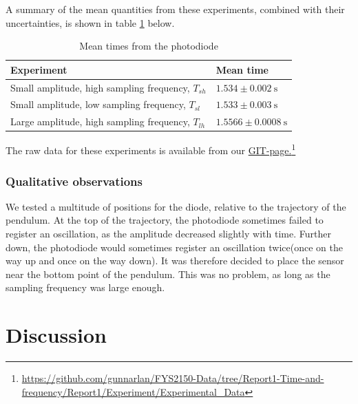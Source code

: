 \documentclass[a4paper, 10pt]{article}
\begin{document}
\linebreak
A summary of the mean quantities from these experiments, combined with their uncertainties, is shown in table \ref{tab:mean_times_photodiode} below.
\begin{table}[hb!]
\centering
\caption{Mean times from the photodiode}
\label{tab:mean_times_photodiode}
\begin{tabular}{|l|l|}
\hline
\textbf{Experiment}                              & \textbf{Mean time}                 \\
\hline
Small amplitude, high sampling frequency, $T_{sh}$     & $1.534 \pm 0.002 \ \mathrm{s}$ \\
Small amplitude, low sampling frequency, $T_{sl}$ & $1.533 \pm 0.003\ \mathrm{s}$   \\
Large amplitude, high sampling frequency, $T_{lh}$ & $1.5566 \pm 0.0008\ \mathrm{s}$   \\
\hline 
\end{tabular}
\end{table}
The raw data for these experiments is available from our \href{https://github.com/gunnarlan/FYS2150-Data/tree/Report1-Time-and-frequency/Report1/Experiment/Experimental_Data}{GIT-page.}\footnote{\url{https://github.com/gunnarlan/FYS2150-Data/tree/Report1-Time-and-frequency/Report1/Experiment/Experimental_Data}}
\subsubsection{Qualitative observations} \label{photodiode_qualitat}
We tested a multitude of positions for the diode, relative to the trajectory of the pendulum. At the top of the trajectory, the photodiode sometimes failed to register an oscillation, as the amplitude decreased slightly with time. Further down, the photodiode would sometimes register an oscillation twice(once on the way up and once on the way down). It was therefore decided to place the sensor near the bottom point of the pendulum. This was no problem, as long as the sampling frequency was large enough.
\section{Discussion}
\end{document}
